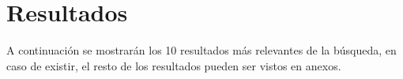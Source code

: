 \chapter{Resultados}
 A continuación se mostrarán los 10 resultados más 
    relevantes de la búsqueda, en caso de existir, el resto de los resultados pueden ser vistos en anexos.
 